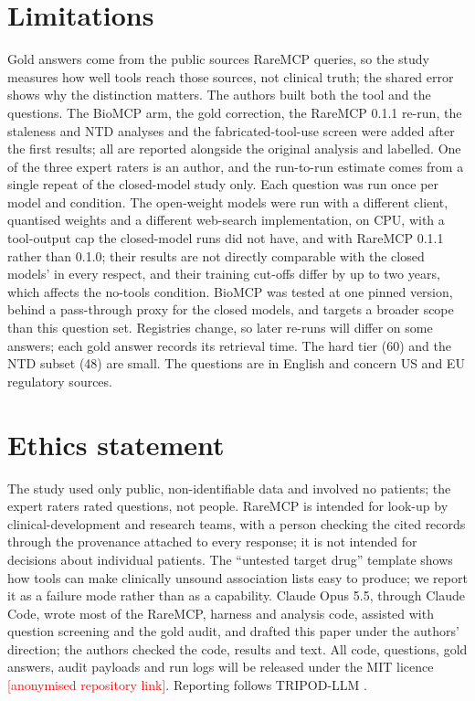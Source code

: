 \documentclass[11pt]{article}
\newcommand{\todo}[1]{\textcolor{red}{[#1]}}
\begin{document}
\section*{Limitations}

Gold answers come from the public sources RareMCP queries, so the study measures how well tools reach those sources, not clinical truth; the shared error shows why the distinction matters. The authors built both the tool and the questions. The BioMCP arm, the gold correction, the RareMCP 0.1.1 re-run, the staleness and NTD analyses and the fabricated-tool-use screen were added after the first results; all are reported alongside the original analysis and labelled. One of the three expert raters is an author, and the run-to-run estimate comes from a single repeat of the closed-model study only. Each question was run once per model and condition. The open-weight models were run with a different client, quantised weights and a different web-search implementation, on CPU, with a tool-output cap the closed-model runs did not have, and with RareMCP 0.1.1 rather than 0.1.0; their results are not directly comparable with the closed models' in every respect, and their training cut-offs differ by up to two years, which affects the no-tools condition. BioMCP was tested at one pinned version, behind a pass-through proxy for the closed models, and targets a broader scope than this question set. Registries change, so later re-runs will differ on some answers; each gold answer records its retrieval time. The hard tier (60) and the NTD subset (48) are small. The questions are in English and concern US and EU regulatory sources.

\section*{Ethics statement}

The study used only public, non-identifiable data and involved no patients; the expert raters rated questions, not people. RareMCP is intended for look-up by clinical-development and research teams, with a person checking the cited records through the provenance attached to every response; it is not intended for decisions about individual patients. The ``untested target drug'' template shows how tools can make clinically unsound association lists easy to produce; we report it as a failure mode rather than as a capability. Claude Opus 5.5, through Claude Code, wrote most of the RareMCP, harness and analysis code, assisted with question screening and the gold audit, and drafted this paper under the authors' direction; the authors checked the code, results and text. All code, questions, gold answers, audit payloads and run logs will be released under the MIT licence \todo{anonymised repository link}. Reporting follows TRIPOD-LLM \citep{tripodllm}.
\end{document}
